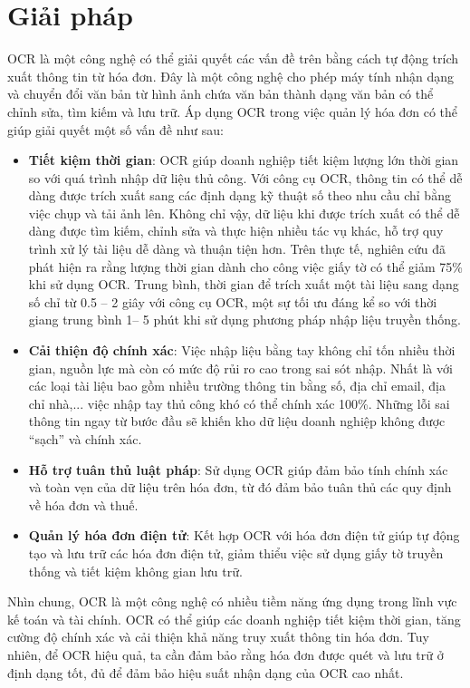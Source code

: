 \section{Giải pháp}
OCR là một công nghệ có thể giải quyết các vấn đề trên bằng cách tự động trích xuất thông tin từ hóa đơn. Đây là một công nghệ cho phép máy tính nhận dạng và chuyển đổi văn bản từ hình ảnh chứa văn bản thành dạng văn bản có thể chỉnh sửa, tìm kiếm và lưu trữ. Áp dụng OCR trong việc quản lý hóa đơn có thể giúp giải quyết một số vấn đề như sau:
\begin{itemize}
    \item \textbf{Tiết kiệm thời gian}: OCR giúp doanh nghiệp tiết kiệm lượng lớn thời gian so với quá trình nhập dữ liệu thủ công. Với công cụ OCR, thông tin có thể dễ dàng được trích xuất sang các định dạng kỹ thuật số theo nhu cầu chỉ bằng việc chụp và tải ảnh lên. Không chỉ vậy, dữ liệu khi được trích xuất có thể dễ dàng được tìm kiếm, chỉnh sửa và thực hiện nhiều tác vụ khác, hỗ trợ quy trình xử lý tài liệu dễ dàng và thuận tiện hơn. Trên thực tế, nghiên cứu đã phát hiện ra rằng lượng thời gian dành cho công việc giấy tờ có thể giảm 75\% khi sử dụng OCR. Trung bình, thời gian để trích xuất một tài liệu sang dạng số chỉ từ 0.5 – 2 giây với công cụ OCR, một sự tối ưu đáng kể so với thời giang trung bình 1– 5 phút khi sử dụng phương pháp nhập liệu truyền thống. \cite{fptai}
    \item \textbf{Cải thiện độ chính xác}: Việc nhập liệu bằng tay không chỉ tốn nhiều thời gian, nguồn lực mà còn có mức độ rủi ro cao trong sai sót nhập. Nhất là với các loại tài liệu bao gồm nhiều trường thông tin bằng số, địa chỉ email, địa chỉ nhà,... việc nhập tay thủ công khó có thể chính xác 100\%. Những lỗi sai thông tin ngay từ bước đầu sẽ khiến kho dữ liệu doanh nghiệp không được “sạch” và chính xác. 
    \item \textbf{Hỗ trợ tuân thủ luật pháp}: Sử dụng OCR giúp đảm bảo tính chính xác và toàn vẹn của dữ liệu trên hóa đơn, từ đó đảm bảo tuân thủ các quy định về hóa đơn và thuế.
    \item \textbf{Quản lý hóa đơn điện tử}: Kết hợp OCR với hóa đơn điện tử giúp tự động tạo và lưu trữ các hóa đơn điện tử, giảm thiểu việc sử dụng giấy tờ truyền thống và tiết kiệm không gian lưu trữ.
\end{itemize}

Nhìn chung, OCR là một công nghệ có nhiều tiềm năng ứng dụng trong lĩnh vực kế toán và tài chính. OCR có thể giúp các doanh nghiệp tiết kiệm thời gian, tăng cường độ chính xác và cải thiện khả năng truy xuất thông tin hóa đơn. Tuy nhiên, để OCR hiệu quả, ta cần đảm bảo rằng hóa đơn được quét và lưu trữ ở định dạng tốt, đủ để đảm bảo hiệu suất nhận dạng của OCR cao nhất. 

